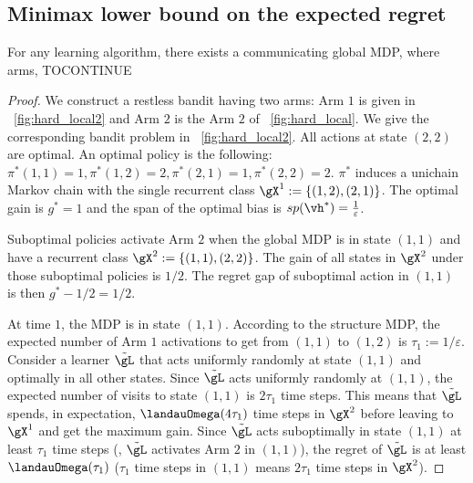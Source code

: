 \subsection{Minimax lower bound on the expected regret}

\begin{thm}
    For any learning algorithm, there exists a communicating global MDP, where arms, TOCONTINUE
\end{thm}
\begin{proof}
    We construct a restless bandit having two arms: Arm $1$ is given in \figurename~\ref{fig:hard_local2} and Arm $2$ is the Arm $2$ of \figurename~\ref{fig:hard_local}.
    We give the corresponding bandit problem in \figurename~\ref{fig:hard_local2}.
    All actions at state $(2,2)$ are optimal.
    An optimal policy is the following: $\pi^*(1,1)=1, \pi^*(1,2)=2, \pi^*(2,1)=1, \pi^*(2,2)=2$.
    $\pi^*$ induces a unichain Markov chain with the single recurrent class $\gX^1:=\{(1,2),(2,1)\}$.
    The optimal gain is $g^*=1$ and the span of the optimal bias is $sp(\vh^*)=\frac1\varepsilon$.

    Suboptimal policies activate Arm $2$ when the global MDP is in state $(1,1)$ and have a recurrent class $\gX^2:=\{(1,1),(2,2)\}$.
    The gain of all states in $\gX^2$ under those suboptimal policies is $1/2$.
    The regret gap of suboptimal action in $(1,1)$ is then $g^*-1/2=1/2$.

    At time $1$, the MDP is in state $(1,1)$.
    According to the structure MDP, the expected number of Arm $1$ activations to get from $(1,1)$ to $(1,2)$ is $\tau_1:=1/\varepsilon$.
    Consider a learner $\tilde{\gL}$ that acts uniformly randomly at state $(1,1)$ and optimally in all other states. 
    Since $\tilde{\gL}$ acts uniformly randomly at $(1,1)$, the expected number of visits to state $(1,1)$ is $2\tau_1$ time steps.
    This means that $\tilde{\gL}$ spends, in expectation, $\landauOmega(4\tau_1)$ time steps in $\gX^2$ before leaving to $\gX^1$ and get the maximum gain.
    Since $\tilde{\gL}$ acts suboptimally in state $(1,1)$ at least $\tau_1$ time steps (\ie, $\tilde{\gL}$ activates Arm $2$ in $(1,1)$), the regret of $\tilde{\gL}$ is at least $\landauOmega(\tau_1)$ ($\tau_1$ time steps in $(1,1)$ means $2\tau_1$ time steps in $\gX^2$).


\end{proof}
